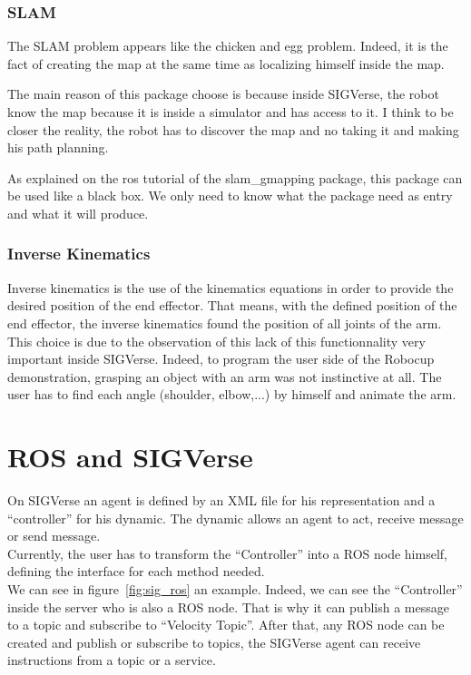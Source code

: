 \subsubsection{SLAM}
The SLAM problem appears like the chicken and egg problem. Indeed, it is the fact of creating the map at the same time as localizing himself inside the map.

The main reason of this package choose is because inside SIGVerse, the robot know the map because it is inside a simulator and has access to it. I think to be closer the reality, the robot has to discover the map and no taking it and making his path planning.

As explained on the ros tutorial of the slam\_gmapping package, this package can be used like a black box. We only need to know what the package need as entry and what it will produce.

\subsubsection{Inverse Kinematics}
Inverse kinematics is the use of the kinematics equations in order to provide the desired position of the end effector. That means, with the defined position of the end effector, the inverse kinematics found the position of all joints of the arm.\\

This choice is due to the observation of this lack of this functionnality very important inside SIGVerse. Indeed, to program the user side of the Robocup demonstration, grasping an object with an arm was not instinctive at all. The user has to find each angle (shoulder, elbow,...) by himself and animate  the arm. %
 

\section{ROS and SIGVerse}
On SIGVerse an agent is defined by an XML file for his representation and a ``controller'' for his dynamic. The dynamic allows an agent to act, receive message or send message.\\
Currently, the user has to transform the ``Controller'' into a ROS node himself, defining the interface for each method needed.\\
We can see in figure~\ref{fig:sig_ros} an example. Indeed, we can see the ``Controller'' inside the server who is also a ROS node. That is why it can publish a message to a topic and subscribe to ``Velocity Topic''. After that, any ROS node can be created and publish or subscribe to topics, the SIGVerse agent can receive instructions from a topic or a service.\\

